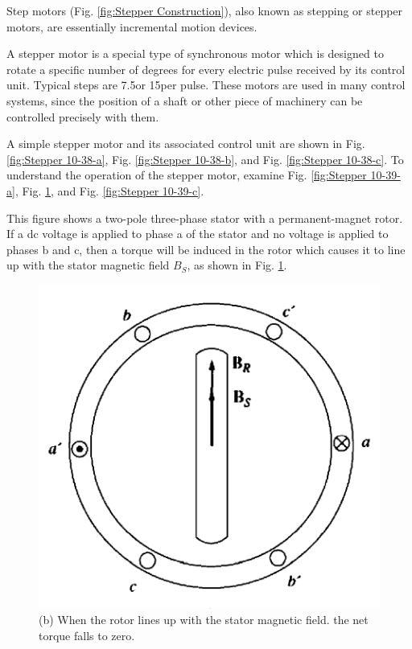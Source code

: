 \documentclass[journal]{IEEEtran}
\begin{document}
Step motors (Fig. \ref{fig:Stepper Construction}), also known as stepping or stepper motors, are essentially incremental motion devices. \cite{guru2007}

A stepper motor is a special type of synchronous motor which is designed to rotate a specific number of degrees for every electric pulse received by its control unit. Typical steps are 7.5\textdegree or 15\textdegree per pulse. These motors are used in many control systems, since the position of a shaft or other piece of machinery can be controlled precisely with them. \cite{chapman2005}

A simple stepper motor and its associated control unit are shown in Fig. \ref{fig:Stepper 10-38-a}, Fig. \ref{fig:Stepper 10-38-b}, and Fig. \ref{fig:Stepper 10-38-c}. To understand the operation of the stepper motor, examine Fig. \ref{fig:Stepper 10-39-a}, Fig. \ref{fig:Stepper 10-39-b}, and Fig. \ref{fig:Stepper 10-39-c}. 


This figure shows a two-pole three-phase stator with a permanent-magnet rotor. If a dc voltage is applied to phase a of the stator and no voltage is applied to phases b and c, then a torque will be induced in the rotor which causes it to line up with the stator magnetic field $B_S$, as shown in Fig. \ref{fig:Stepper 10-39-b}.

\begin{figure}[h]
    \centering
    \includegraphics[scale=0.39]{Stepper/fig 10-39-b.PNG}
    \caption{(b) When the rotor lines up with the stator magnetic field. the net torque falls to zero. }
    \label{fig:Stepper 10-39-b}
\end{figure}
\end{document}
